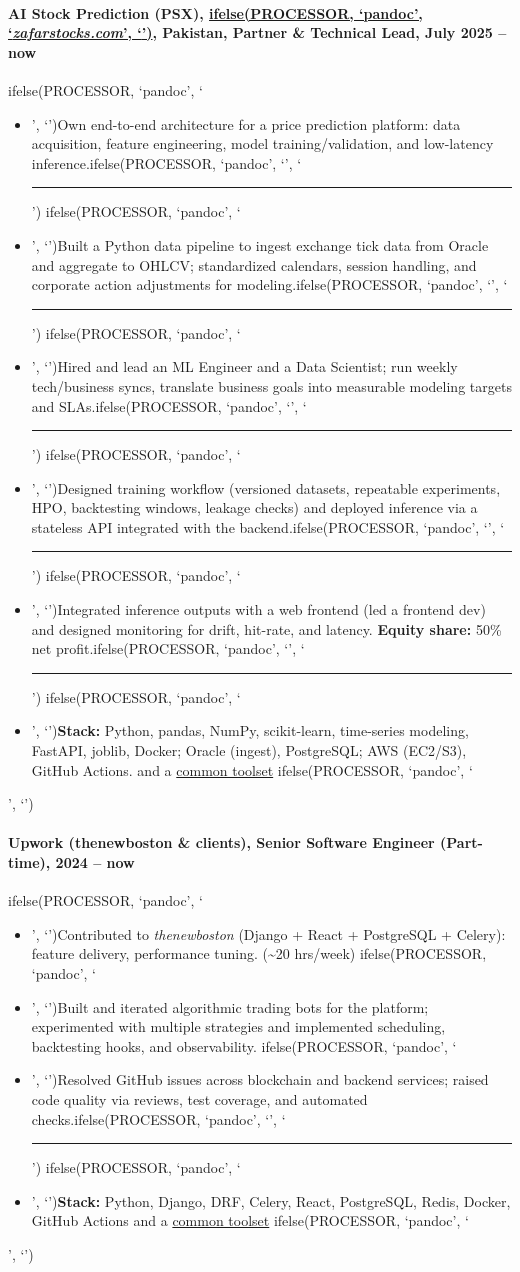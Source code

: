 \documentclass[a4paper,11pt]{article}
\newcommand{\chref}[2]{\href{#1}
{ifelse(PROCESSOR, `pandoc', `#2', `\underline{\smash{#2}}')}}
\newcommand{\itchref}[2]{\chref{#1}{\textit{#2}}}  %
\newcommand{\chrule}{ifelse(PROCESSOR, `pandoc', `', `\vspace{3pt}\hrule')}
\newcommand{\pdbeginitemize}{ifelse(PROCESSOR, `pandoc', `\begin{itemize}', `')}
\newcommand{\pditem}{ifelse(PROCESSOR, `pandoc', `\item', `')}
\newcommand{\pdenditemize}{ifelse(PROCESSOR, `pandoc', `\end{itemize}', `')}
\begin{document}
\paragraph*{AI Stock Prediction (PSX), \itchref{https://www.zafarstocks.com}{zafarstocks.com}, Pakistan, Partner \& Technical Lead, July 2025 -- now}
\pdbeginitemize
\pditem Own end-to-end architecture for a price prediction platform: data acquisition, feature engineering, model training/validation, and low-latency inference.\chrule
\pditem Built a Python data pipeline to ingest exchange tick data from Oracle and aggregate to OHLCV; standardized calendars, session handling, and corporate action adjustments for modeling.\chrule
\pditem Hired and lead an ML Engineer and a Data Scientist; run weekly tech/business syncs, translate business goals into measurable modeling targets and SLAs.\chrule
\pditem Designed training workflow (versioned datasets, repeatable experiments, HPO, backtesting windows, leakage checks) and deployed inference via a stateless API integrated with the backend.\chrule
\pditem Integrated inference outputs with a web frontend (led a frontend dev) and designed monitoring for drift, hit-rate, and latency. \textbf{Equity share:} 50\% net profit.\chrule
\pditem \textbf{Stack:} Python, pandas, NumPy, scikit-learn, time-series modeling, FastAPI, joblib, Docker; Oracle (ingest), PostgreSQL; AWS (EC2/S3), GitHub Actions.  and a \hyperlink{common-toolset}{common toolset}
\pdenditemize

\paragraph*{Upwork (thenewboston \& clients), Senior Software Engineer (Part-time), 2024 -- now}
\pdbeginitemize
\pditem Contributed to \textit{thenewboston} (Django + React + PostgreSQL + Celery): feature delivery, performance tuning. (\textasciitilde20 hrs/week)
\pditem Built and iterated algorithmic trading bots for the platform; experimented with multiple strategies and implemented scheduling, backtesting hooks, and observability.
\pditem Resolved GitHub issues across blockchain and backend services; raised code quality via reviews, test coverage, and automated checks.\chrule
\pditem \textbf{Stack:} Python, Django, DRF, Celery, React, PostgreSQL, Redis, Docker, GitHub Actions and a \hyperlink{common-toolset}{common toolset}
\pdenditemize
\end{document}
